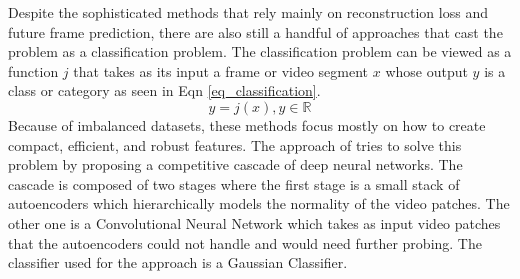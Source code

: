 Despite the sophisticated methods that rely mainly on reconstruction loss and future frame prediction, there are also still a handful of approaches that cast the problem as a classification problem. The classification problem can be viewed as a function $j$ that takes as its input a frame or video segment $x$ whose output $y$ is a class or category as seen in Eqn \ref{eq_classification}.
\begin{equation}\label{eq_classification}
    y = j(x), y \in \mathbb{R}
\end{equation}
Because of imbalanced datasets, these methods focus mostly on how to create compact, efficient, and robust features. The approach of  tries to solve this problem by proposing a competitive cascade of deep neural networks. The cascade is composed of two stages where the first stage is a small stack of autoencoders which hierarchically models the normality of the video patches. The other one is a Convolutional Neural Network which takes as input video patches that the autoencoders could not handle and would need further probing. The classifier used for the approach is a Gaussian Classifier.
